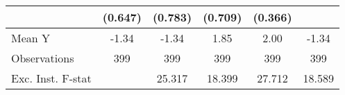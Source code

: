 {\begin{tabular}{l*{5}{c}}
            &     (0.647)         &     (0.783)         &     (0.709)         &     (0.366)         &                     \\
\midrule
Mean Y      &       -1.34         &       -1.34         &        1.85         &        2.00         &       -1.34         \\
Observations&         399         &         399         &         399         &         399         &         399         \\
Exc. Inst. F-stat&                     &      25.317         &      18.399         &      27.712         &      18.589         \\
\bottomrule
\end{tabular}
}
